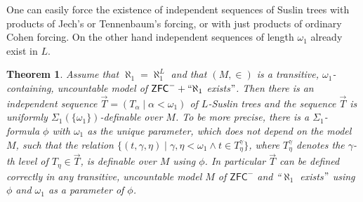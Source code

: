 \documentclass[a4paper,11pt]{article}
\newtheorem{theorem}{Theorem}[section]
\newcommand{\ZFC}{\mathsf{ZFC}}
\begin{document}
One can easily force the existence of independent sequences of Suslin trees with products of Jech's or Tennenbaum's forcing, or with just products of ordinary Cohen forcing. On the other hand independent sequences of length $\omega_1$ already exist in $L$. 

\begin{theorem}\label{DefinitionIndependentSequence}
Assume that $\aleph_1= \aleph_1^L$ and that $ (M,\in)$ is a transitive, $\omega_1$-containing, uncountable model of $\ZFC^{-} + ``\aleph_1$ exists$"$.  Then there is an independent sequence $\vec{T} = ( T_{\alpha} \mid \alpha < \omega_1)$ of $L$-Suslin trees and the sequence $\vec{T}$ is uniformly $\Sigma_1 ( \{ \omega_1 \} )$-definable over $M$. To be more precise,
there is a $\Sigma_1$-formula $\phi$  with $\omega_1$ as the unique parameter, which does not depend on the model $M$, such that
the relation $\{ (t,\gamma,\eta) \mid \gamma,\eta < \omega_1 \land t \in T_{\eta}^{\gamma}  \}$, where $T_{\eta}^{\gamma}$ denotes the $\gamma$-th level of $T_{\eta} \in \vec{T}$, is definable over $M$ using $\phi$. In particular $\vec{T}$ can be defined correctly in any transitive, uncountable model $M$ of $\ZFC^-$ and ``$\aleph_1$ exists$"$ using $\phi$ and $\omega_1$ as a parameter of $\phi$.

\end{theorem}
\end{document}
